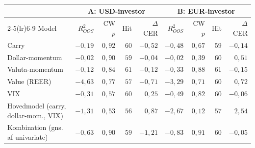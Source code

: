 \begin{tabular}{lrrrrrrrr}
\toprule
 & \multicolumn{4}{c}{A: USD-investor} & \multicolumn{4}{c}{B: EUR-investor} \\
\cmidrule(lr){2-5}\cmidrule(lr){6-9}
Model & $R^2_{OOS}$ & CW $p$ & Hit & $\Delta$CER & $R^2_{OOS}$ & CW $p$ & Hit & $\Delta$CER \\
\midrule
Carry & $-0{,}19$ & $0{,}92$ & $60$ & $-0{,}52$ & $-0{,}48$ & $0{,}67$ & $59$ & $-0{,}14$ \\
Dollar-momentum & $-0{,}02$ & $0{,}90$ & $59$ & $-0{,}04$ & $-0{,}02$ & $0{,}39$ & $60$ & $0{,}51$ \\
Valuta-momentum & $-0{,}12$ & $0{,}84$ & $61$ & $-0{,}12$ & $-0{,}33$ & $0{,}88$ & $61$ & $-0{,}15$ \\
Value (REER) & $-4{,}63$ & $0{,}77$ & $57$ & $-0{,}71$ & $-3{,}29$ & $0{,}71$ & $60$ & $0{,}72$ \\
VIX & $-0{,}31$ & $0{,}57$ & $60$ & $0{,}25$ & $-0{,}49$ & $0{,}82$ & $60$ & $-0{,}06$ \\
\midrule
Hovedmodel (carry, dollar-mom., VIX) & $-1{,}31$ & $0{,}53$ & $56$ & $0{,}87$ & $-2{,}67$ & $0{,}12$ & $57$ & $2{,}54$ \\
Kombination (gns. af univariate) & $-0{,}63$ & $0{,}90$ & $59$ & $-1{,}21$ & $-0{,}83$ & $0{,}91$ & $60$ & $-0{,}05$ \\
\bottomrule
\end{tabular}
